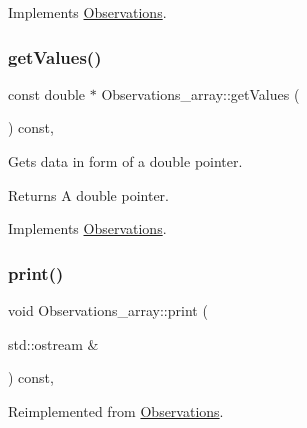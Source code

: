 Implements \mbox{\hyperlink{class_observations_a85358b5d09f0ea02e27e06be09501cec}{Observations}}.

\mbox{\label{class_observations__array_ac024322acc4826e7fa60fddc74e4b3a3}} 
\subsubsection{\texorpdfstring{get\+Values()}{getValues()}}
{\footnotesize\ttfamily const double $\ast$ Observations\+\_\+array\+::get\+Values (\begin{DoxyParamCaption}{ }\end{DoxyParamCaption}) const\hspace{0.3cm}{\ttfamily [override]}, {\ttfamily [virtual]}}

Gets data in form of a double pointer. \begin{DoxyReturn}{Returns}
A double pointer. 
\end{DoxyReturn}


Implements \mbox{\hyperlink{class_observations_aa626ffb450b4647e1291053dd5b6d03c}{Observations}}.

\mbox{\label{class_observations__array_a2563545e5a38ec7e3ec09380c0b38855}} 
\subsubsection{\texorpdfstring{print()}{print()}}
{\footnotesize\ttfamily void Observations\+\_\+array\+::print (\begin{DoxyParamCaption}\item[{std\+::ostream \&}]{ }\end{DoxyParamCaption}) const\hspace{0.3cm}{\ttfamily [override]}, {\ttfamily [virtual]}}



Reimplemented from \mbox{\hyperlink{class_observations_a523647c5ae644959f0ed583cd7b11aba}{Observations}}.

\mbox{\label{class_observations__array_aa6b6e042f8db0afad3beaff248b4a602}} 
